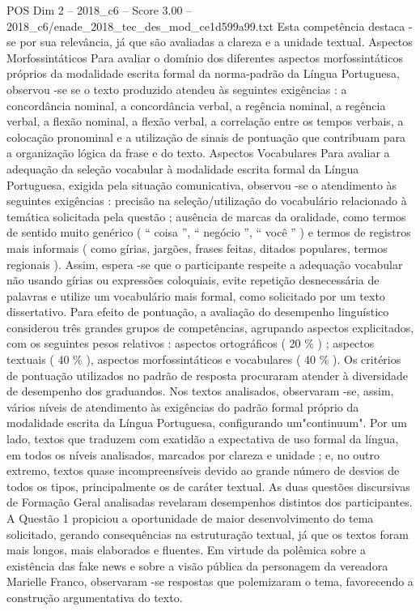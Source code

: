 \begin{textsample}{POS Dim 2 – 2018\_c6 – Score 3.00 – 2018\_c6/enade\_2018\_tec\_des\_mod\_ce1d599a99.txt}
Esta competência destaca -se por sua relevância, já que são avaliadas a clareza e a unidade textual.
Aspectos Morfossintáticos Para avaliar o domínio dos diferentes aspectos morfossintáticos próprios da modalidade escrita formal da norma-padrão da Língua Portuguesa, observou -se se o texto produzido atendeu às seguintes exigências : a concordância nominal, a concordância verbal, a regência nominal, a regência verbal, a flexão nominal, a flexão verbal, a correlação entre os tempos verbais, a colocação pronominal e a utilização de sinais de pontuação que contribuam para a organização lógica da frase e do texto.
Aspectos Vocabulares Para avaliar a adequação da seleção vocabular à modalidade escrita formal da Língua Portuguesa, exigida pela situação comunicativa, observou -se o atendimento às seguintes exigências : precisão na seleção/utilização do vocabulário relacionado à temática solicitada pela questão ; ausência de marcas da oralidade, como termos de sentido muito genérico ( “ coisa ”, “ negócio ”, “ você ” ) e termos de registros mais informais ( como gírias, jargões, frases feitas, ditados populares, termos regionais ).
Assim, espera -se que o participante respeite a adequação vocabular não usando gírias ou expressões coloquiais, evite repetição desnecessária de palavras e utilize um vocabulário mais formal, como solicitado por um texto dissertativo.
Para efeito de pontuação, a avaliação do desempenho linguístico considerou três grandes grupos de competências, agrupando aspectos explicitados, com os seguintes pesos relativos : aspectos ortográficos ( 20 \% ) ; aspectos textuais ( 40 \% ), aspectos morfossintáticos e vocabulares ( 40 \% ).
Os critérios de pontuação utilizados no padrão de resposta procuraram atender à diversidade de desempenho dos graduandos.
Nos textos analisados, observaram -se, assim, vários níveis de atendimento às exigências do padrão formal próprio da modalidade escrita da Língua Portuguesa, configurando um"continuum".
Por um lado, textos que traduzem com exatidão a expectativa de uso formal da língua, em todos os níveis analisados, marcados por clareza e unidade ; e, no outro extremo, textos quase incompreensíveis devido ao grande número de desvios de todos os tipos, principalmente os de caráter textual.
As duas questões discursivas de Formação Geral analisadas revelaram desempenhos distintos dos participantes.
A Questão 1 propiciou a oportunidade de maior desenvolvimento do tema solicitado, gerando consequências na estruturação textual, já que os textos foram mais longos, mais elaborados e fluentes.
Em virtude da polêmica sobre a existência das fake news e sobre a visão pública da personagem da vereadora Marielle Franco, observaram -se respostas que polemizaram o tema, favorecendo a construção argumentativa do texto.

\end{textsample}
